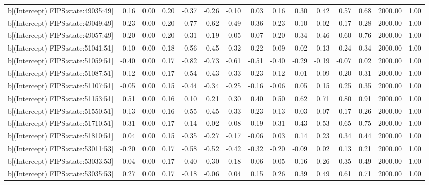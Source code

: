 \begin{table}[ht]
\begin{tabular}{rrrrrrrrrrrrrrr}
  b[(Intercept) FIPS:state:49035:49] & 0.16 & 0.00 & 0.20 & -0.37 & -0.26 & -0.10 & 0.03 & 0.16 & 0.30 & 0.42 & 0.57 & 0.68 & 2000.00 & 1.00 \\ 
  b[(Intercept) FIPS:state:49049:49] & -0.23 & 0.00 & 0.20 & -0.77 & -0.62 & -0.49 & -0.36 & -0.23 & -0.10 & 0.02 & 0.17 & 0.28 & 2000.00 & 1.00 \\ 
  b[(Intercept) FIPS:state:49057:49] & 0.20 & 0.00 & 0.20 & -0.31 & -0.19 & -0.05 & 0.07 & 0.20 & 0.34 & 0.46 & 0.60 & 0.76 & 2000.00 & 1.00 \\ 
  b[(Intercept) FIPS:state:51041:51] & -0.10 & 0.00 & 0.18 & -0.56 & -0.45 & -0.32 & -0.22 & -0.09 & 0.02 & 0.13 & 0.24 & 0.34 & 2000.00 & 1.00 \\ 
  b[(Intercept) FIPS:state:51059:51] & -0.40 & 0.00 & 0.17 & -0.82 & -0.73 & -0.61 & -0.51 & -0.40 & -0.29 & -0.19 & -0.07 & 0.02 & 2000.00 & 1.00 \\ 
  b[(Intercept) FIPS:state:51087:51] & -0.12 & 0.00 & 0.17 & -0.54 & -0.43 & -0.33 & -0.23 & -0.12 & -0.01 & 0.09 & 0.20 & 0.31 & 2000.00 & 1.00 \\ 
  b[(Intercept) FIPS:state:51107:51] & -0.05 & 0.00 & 0.15 & -0.44 & -0.34 & -0.25 & -0.16 & -0.06 & 0.05 & 0.15 & 0.25 & 0.35 & 2000.00 & 1.00 \\ 
  b[(Intercept) FIPS:state:51153:51] & 0.51 & 0.00 & 0.16 & 0.10 & 0.21 & 0.30 & 0.40 & 0.50 & 0.62 & 0.71 & 0.80 & 0.91 & 2000.00 & 1.00 \\ 
  b[(Intercept) FIPS:state:51550:51] & -0.13 & 0.00 & 0.16 & -0.55 & -0.45 & -0.33 & -0.23 & -0.13 & -0.03 & 0.07 & 0.17 & 0.26 & 2000.00 & 1.00 \\ 
  b[(Intercept) FIPS:state:51710:51] & 0.31 & 0.00 & 0.17 & -0.14 & -0.02 & 0.08 & 0.19 & 0.31 & 0.43 & 0.53 & 0.65 & 0.75 & 2000.00 & 1.00 \\ 
  b[(Intercept) FIPS:state:51810:51] & 0.04 & 0.00 & 0.15 & -0.35 & -0.27 & -0.17 & -0.06 & 0.03 & 0.14 & 0.23 & 0.34 & 0.44 & 2000.00 & 1.00 \\ 
  b[(Intercept) FIPS:state:53011:53] & -0.20 & 0.00 & 0.17 & -0.58 & -0.52 & -0.42 & -0.32 & -0.20 & -0.09 & 0.02 & 0.13 & 0.21 & 2000.00 & 1.00 \\ 
  b[(Intercept) FIPS:state:53033:53] & 0.04 & 0.00 & 0.17 & -0.40 & -0.30 & -0.18 & -0.06 & 0.05 & 0.16 & 0.26 & 0.35 & 0.49 & 2000.00 & 1.00 \\ 
  b[(Intercept) FIPS:state:53035:53] & 0.27 & 0.00 & 0.17 & -0.18 & -0.06 & 0.04 & 0.15 & 0.26 & 0.39 & 0.49 & 0.61 & 0.71 & 2000.00 & 1.00 \\ 

\end{tabular}
\end{table}
